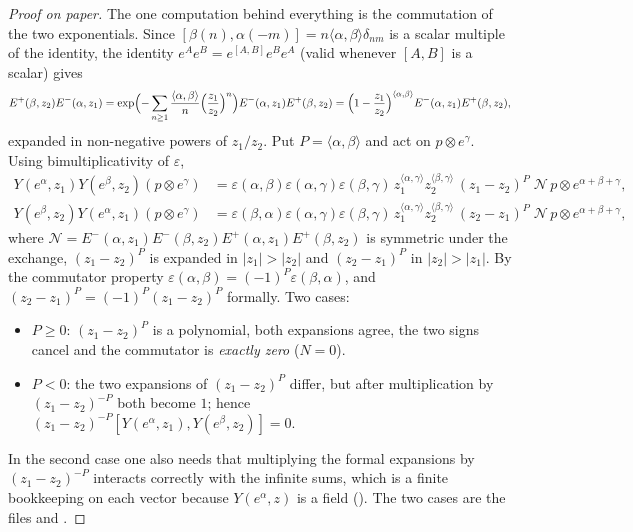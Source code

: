 \begin{proof}[Proof on paper]
The one computation behind everything is the commutation of the two exponentials. Since
$[\beta(n),\alpha(-m)]=n\langle\alpha,\beta\rangle\delta_{nm}$ is a scalar multiple of the identity,
the identity $e^Ae^B=e^{[A,B]}e^Be^A$ (valid whenever $[A,B]$ is a scalar) gives
\begin{equation*}
 E^+(\beta,z_2)E^-(\alpha,z_1)=\exp\Bigl(-\sum_{n\ge1}\frac{\langle\alpha,\beta\rangle}{n}
 \Bigl(\frac{z_1}{z_2}\Bigr)^n\Bigr)E^-(\alpha,z_1)E^+(\beta,z_2)
 =\Bigl(1-\frac{z_1}{z_2}\Bigr)^{\langle\alpha,\beta\rangle}E^-(\alpha,z_1)E^+(\beta,z_2),
\end{equation*}
expanded in non-negative powers of $z_1/z_2$. Put $P=\langle\alpha,\beta\rangle$ and act on
$p\otimes e^\gamma$. Using bimultiplicativity of $\varepsilon$,
\begin{align*}
 Y(e^\alpha,z_1)Y(e^\beta,z_2)(p\otimes e^\gamma)&=\varepsilon(\alpha,\beta)\varepsilon(\alpha,\gamma)
 \varepsilon(\beta,\gamma)\,z_1^{\langle\alpha,\gamma\rangle}z_2^{\langle\beta,\gamma\rangle}
 \,(z_1-z_2)^P\;\mathcal N\,p\otimes e^{\alpha+\beta+\gamma},\\
 Y(e^\beta,z_2)Y(e^\alpha,z_1)(p\otimes e^\gamma)&=\varepsilon(\beta,\alpha)\varepsilon(\alpha,\gamma)
 \varepsilon(\beta,\gamma)\,z_1^{\langle\alpha,\gamma\rangle}z_2^{\langle\beta,\gamma\rangle}
 \,(z_2-z_1)^P\;\mathcal N\,p\otimes e^{\alpha+\beta+\gamma},
\end{align*}
where $\mathcal N=E^-(\alpha,z_1)E^-(\beta,z_2)E^+(\alpha,z_1)E^+(\beta,z_2)$ is symmetric under the
exchange, $(z_1-z_2)^P$ is expanded in $|z_1|>|z_2|$ and $(z_2-z_1)^P$ in $|z_2|>|z_1|$. By the
commutator property $\varepsilon(\alpha,\beta)=(-1)^P\varepsilon(\beta,\alpha)$, and
$(z_2-z_1)^P=(-1)^P(z_1-z_2)^P$ formally. Two cases:
\begin{itemize}
\item $P\geq0$: $(z_1-z_2)^P$ is a polynomial, both expansions agree, the two signs cancel and the
  commutator is \emph{exactly zero} ($N=0$).
\item $P<0$: the two expansions of $(z_1-z_2)^P$ differ, but after multiplication by
  $(z_1-z_2)^{-P}$ both become $1$; hence $(z_1-z_2)^{-P}[Y(e^\alpha,z_1),Y(e^\beta,z_2)]=0$.
\end{itemize}
In the second case one also needs that multiplying the formal expansions by
$(z_1-z_2)^{-P}$ interacts correctly with the infinite sums, which is a finite bookkeeping on each
vector because $Y(e^\alpha,z)$ is a field (). The two cases are the files
 and .
\end{proof}

